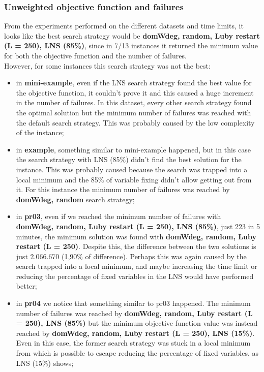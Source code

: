 \subsubsection{Unweighted objective function and failures}
\label{subsubsec:failures-unweighted-obj-fun}
From the experiments performed on the different datasets and time limits, it looks like the best search strategy would be \textbf{domWdeg, random, Luby restart (L = 250), LNS (85\%)}, since in 7/13 instances it returned the minimum value for both the objective function and the number of failures.\\
However, for some instances this search strategy was not the best:
\begin{itemize}
    \item in \textbf{mini-example}, even if the LNS search strategy found the best value for the objective function, it couldn't prove it and this caused a huge increment in the number of failures. In this dataset, every other search strategy found the optimal solution but the minimum number of failures was reached with the default search strategy. This was probably caused by the low complexity of the instance;
    \item in \textbf{example}, something similar to mini-example happened, but in this case the search strategy with LNS (85\%) didn't find the best solution for the instance. This was probably caused because the search was trapped into a local minimum and the 85\% of variable fixing didn't allow getting out from it. For this instance the minimum number of failures was reached by \textbf{domWdeg, random} search strategy;
    \item in \textbf{pr03}, even if we reached the minimum number of failures with \textbf{domWdeg, random, Luby restart (L = 250), LNS (85\%)}, just 223 in 5 minutes, the minimum solution was found with \textbf{domWdeg, random, Luby restart (L = 250)}. Despite this, the difference between the two solutions is just 2.066.670 (1,90\% of difference). Perhaps this was again caused by the search trapped into a local minimum, and maybe increasing the time limit or reducing the percentage of fixed variables in the LNS would have performed better;
    \item in \textbf{pr04} we notice that something similar to pr03 happened. The minimum number of failures was reached by \textbf{domWdeg, random, Luby restart (L = 250), LNS (85\%)} but the minimum objective function value was instead reached by \textbf{domWdeg, random, Luby restart (L = 250), LNS (15\%)}. Even in this case, the former search strategy was stuck in a local minimum from which is possible to escape reducing the percentage of fixed variables, as LNS (15\%) shows;

\end{itemize}
